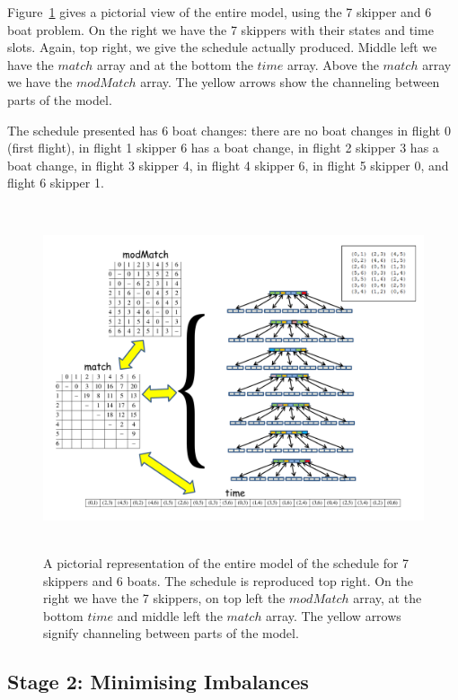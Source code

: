 \documentclass{llncs}
\newcommand{\match}{\mathit{match}}
\newcommand{\modMatch}{\mathit{modMatch}}
\newcommand{\timeVar}{\mathit{time}}
\begin{document}
\bigskip \noindent Figure~\ref{schedChanges} gives a pictorial view of the entire model, using the 7
skipper and 6 boat problem. On the right we have the 7 skippers with their states and time slots.
Again, top right, we give the schedule actually produced.  Middle left we have the $\match$ array
and at the bottom the $\timeVar$ array. Above the $match$ array we have the $\modMatch$ array. The
yellow arrows show the channeling between parts of the model.

The schedule presented has 6 boat changes: there are no boat changes in flight 0 (first flight), in
flight 1 skipper 6 has a boat change, in flight 2 skipper 3 has a boat change, in flight 3 skipper
4, in flight 4 skipper 6, in flight 5 skipper 0, and flight 6 skipper 1.

\begin{figure}[tb]
\centering
\includegraphics[height=10.2cm,width=13.2cm]{schedule.pdf}
\caption{A pictorial representation of the entire model of the schedule for 7 skippers and 6 boats.
The schedule is reproduced top right. On the right we have the 7 skippers, on top left the
$\modMatch$ array, at the bottom $\timeVar$ and middle left the $\match$ array. The yellow arrows
signify channeling between parts of the model.}
\label{schedChanges}
\end{figure}

\subsection{Stage 2: Minimising Imbalances}
\end{document}

